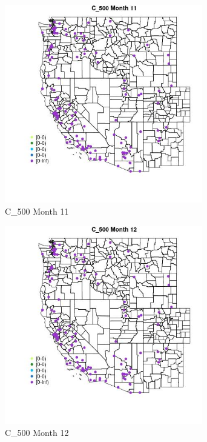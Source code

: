 \begin{figure} 
\centering  
\includegraphics[width=0.77\textwidth]{Code_Outputs/Report_ML_input_PM25_Step4_part_e_de_duplicated_aves_MapObsMo11C_500.jpg} 
\caption{\label{fig:Report_ML_input_PM25_Step4_part_e_de_duplicated_avesMapObsMo11C_500}C_500 Month 11} 
\end{figure} 
 

\begin{figure} 
\centering  
\includegraphics[width=0.77\textwidth]{Code_Outputs/Report_ML_input_PM25_Step4_part_e_de_duplicated_aves_MapObsMo12C_500.jpg} 
\caption{\label{fig:Report_ML_input_PM25_Step4_part_e_de_duplicated_avesMapObsMo12C_500}C_500 Month 12} 
\end{figure} 
 


